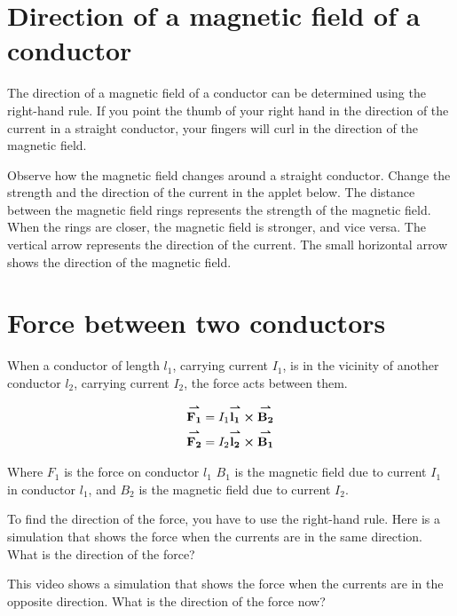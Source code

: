 \documentclass{ximera}
\begin{document}
\section{Direction of a magnetic field of a conductor}

The direction of a magnetic field of a conductor can be determined using the right-hand rule. If you point the thumb of your right hand in the direction of the current in a straight conductor, your fingers will curl in the direction of the magnetic field.

 Observe how the magnetic field changes around a straight conductor. Change the strength and the direction of the current in the applet below. The distance between the magnetic field rings represents the strength of the magnetic field. When the rings are closer, the magnetic field is stronger, and vice versa. The vertical arrow represents the direction of the current. The small horizontal arrow shows the direction of the magnetic field. 


\begin{center}  
\end{center} 


\section{Force between two conductors}

When a conductor of length $l_1$, carrying current $I_1$, is in the vicinity of another conductor $l_2$, carrying current $I_2$, the force acts between them. 


\begin{eqnarray}
{\overset{\boldsymbol{\rightharpoonup}}{\mathbf{F_1}}}\hspace{0in}=I_1 {\overset{\boldsymbol{\rightharpoonup}}{\mathbf{l_1}}}\hspace{0in} \boldsymbol\times {\overset{\boldsymbol{\rightharpoonup}}{\mathbf{B_2}}}\hspace{0in} \\
{\overset{\boldsymbol{\rightharpoonup}}{\mathbf{F_2}}}\hspace{0in}=I_2 {\overset{\boldsymbol{\rightharpoonup}}{\mathbf{l_2}}}\hspace{0in} \boldsymbol\times {\overset{\boldsymbol{\rightharpoonup}}{\mathbf{B_1}}}\hspace{0in}
\end{eqnarray}

Where $F_1$ is the force on conductor $l_1$ $B_1$ is the magnetic field due to current $I_1$ in conductor $l_1$, and $B_2$ is the magnetic field due to current $I_2$.

To find the direction of the force, you have to use the right-hand rule. Here is a simulation that shows the force when the currents are in the same direction. What is the direction of the force?

\begin{center}  
\end{center} 

This video shows a simulation that shows the force when the currents are in the opposite direction. What is the direction of the force now?
\end{document}
